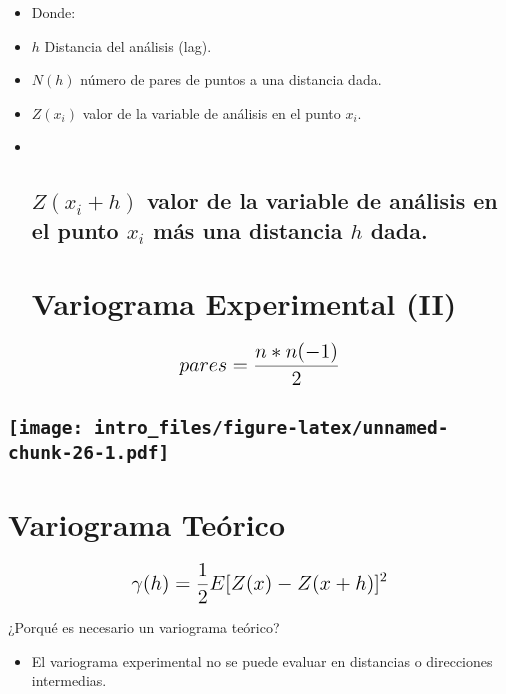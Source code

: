 \documentclass[]{article}
\providecommand{\tightlist}{%
  \setlength{\itemsep}{0pt}\setlength{\parskip}{0pt}}
\begin{document}
\begin{itemize}
\item
  Donde:
\item
  \(h\) Distancia del análisis (lag).
\item
  \(N(h)\) número de pares de puntos a una distancia dada.
\item
  \(Z(x_i)\) valor de la variable de análisis en el punto \(x_i\).
\item ~
  \subsection{\texorpdfstring{\(Z(x_i + h)\) valor de la variable de
  análisis en el punto \(x_i\) más una distancia \(h\)
  dada.}{Z(x\_i + h) valor de la variable de análisis en el punto x\_i más una distancia h dada.}}\label{zx_i-h-valor-de-la-variable-de-analisis-en-el-punto-x_i-mas-una-distancia-h-dada.}

  \section{Variograma Experimental
  (II)}\label{variograma-experimental-ii}
\end{itemize}

\[
\Large
\begin{aligned}
pares = \frac{n*n(-1)}{2}
\end{aligned}
\]

\subsection[]{\texorpdfstring{\protect\texttt{[image: intro\_files/figure-latex/unnamed-chunk-26-1.pdf]}}{}}\label{section-1}

\section{Variograma Teórico}\label{variograma-teorico}

\[
\Large
\begin{aligned}
\gamma (h) = \frac{1}{2}E[Z(x)-Z(x+h)]^{2}
\end{aligned}
\]

 ¿Porqué es necesario un variograma teórico?

\begin{itemize}
\tightlist
\item
  El variograma experimental no se puede evaluar en distancias o
  direcciones intermedias.
\end{itemize}
\end{document}
